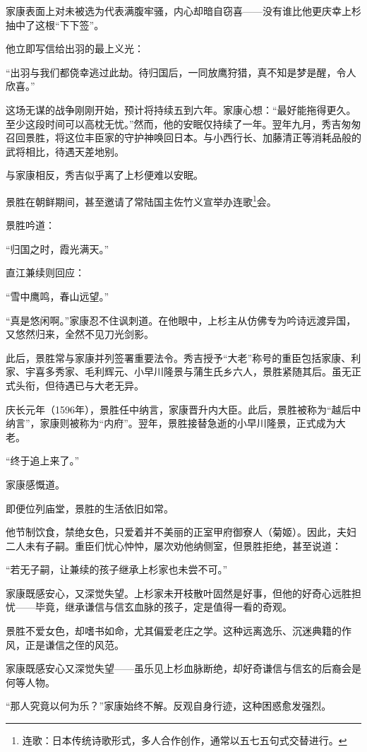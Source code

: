 \documentclass[
]{article}
\begin{document}
家康表面上对未被选为代表满腹牢骚，内心却暗自窃喜------没有谁比他更庆幸上杉抽中了这根``下下签''。

他立即写信给出羽的最上义光：

``出羽与我们都侥幸逃过此劫。待归国后，一同放鹰狩猎，真不知是梦是醒，令人欣喜。''

这场无谋的战争刚刚开始，预计将持续五到六年。家康心想：``最好能拖得更久。至少这段时间可以高枕无忧。''然而，他的安眠仅持续了一年。翌年九月，秀吉匆匆召回景胜，将这位丰臣家的守护神唤回日本。与小西行长、加藤清正等消耗品般的武将相比，待遇天差地别。

与家康相反，秀吉似乎离了上杉便难以安眠。

景胜在朝鲜期间，甚至邀请了常陆国主佐竹义宣举办连歌\footnote{连歌：日本传统诗歌形式，多人合作创作，通常以五七五句式交替进行。}会。

景胜吟道：

``归国之时，霞光满天。''

直江兼续则回应：

``雪中鹰鸣，春山远望。''

``真是悠闲啊。''家康忍不住讽刺道。在他眼中，上杉主从仿佛专为吟诗远渡异国，又悠然归来，全然不见刀光剑影。

此后，景胜常与家康并列签署重要法令。秀吉授予``大老''称号的重臣包括家康、利家、宇喜多秀家、毛利辉元、小早川隆景与蒲生氏乡六人，景胜紧随其后。虽无正式头衔，但待遇已与大老无异。

庆长元年（1596年），景胜任中纳言，家康晋升内大臣。此后，景胜被称为``越后中纳言''，家康则被称为``内府''。翌年，景胜接替急逝的小早川隆景，正式成为大老。

``终于追上来了。''

家康感慨道。

即便位列庙堂，景胜的生活依旧如常。

他节制饮食，禁绝女色，只爱着并不美丽的正室甲府御寮人（菊姬）。因此，夫妇二人未有子嗣。重臣们忧心忡忡，屡次劝他纳侧室，但景胜拒绝，甚至说道：

``若无子嗣，让兼续的孩子继承上杉家也未尝不可。''

家康既感安心，又深觉失望。上杉家未开枝散叶固然是好事，但他的好奇心远胜担忧------毕竟，继承谦信与信玄血脉的孩子，定是值得一看的奇观。

景胜不爱女色，却嗜书如命，尤其偏爱老庄之学。这种远离逸乐、沉迷典籍的作风，正是谦信之侄的风范。

家康既感安心又深觉失望------虽乐见上杉血脉断绝，却好奇谦信与信玄的后裔会是何等人物。

``那人究竟以何为乐？''家康始终不解。反观自身行迹，这种困惑愈发强烈。
\end{document}
